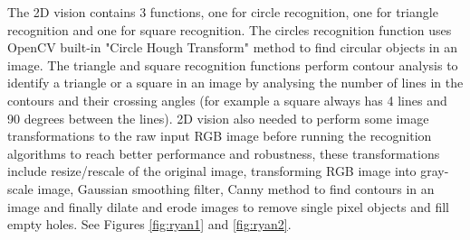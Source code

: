 The 2D vision contains 3 functions, one for circle recognition, one for triangle recognition and one for square recognition. The circles recognition function uses OpenCV built-in "Circle Hough Transform" method to find circular objects in an image. The triangle  and square recognition functions perform contour analysis to identify a triangle or a square in an image by analysing the number of lines in the contours and their crossing angles (for example a square always has 4 lines and 90 degrees between the lines). 2D vision also needed to perform some image transformations to the raw input RGB image before running the recognition algorithms to reach better performance and robustness, these transformations include resize/rescale of the original image, transforming RGB image into gray-scale image, Gaussian smoothing filter, Canny method to find contours in an image and finally dilate and erode images to remove single pixel objects and fill empty holes. See Figures \ref{fig:ryan1} and \ref{fig:ryan2}.

